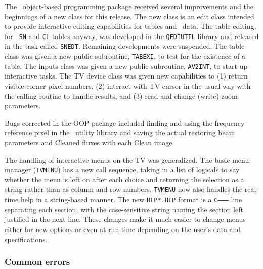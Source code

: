      The \AIPS\ object-based programming package received several
improvements and the beginnings of a new class for this release.  The
new class is an edit class intended to provide interactive editing
capabilities for tables and \uv\ data.  The table editing, for {\tt
SN} and {\tt CL} tables anyway, was developed in the {\tt QEDIUTIL}
library and released in the task called \hbox{{\tt SNEDT}}.  Remaining
developments were suspended.  The table class was given a new public
subroutine, {\tt TABEXI}, to test for the existence of a table.  The
inputs class was given a new public subroutine, {\tt AV2INT}, to start
up interactive tasks. The TV device class was given new capabilities
to (1) return visible-corner pixel numbers, (2) interact with TV
cursor in the usual way with the calling routine to handle results,
and (3) read and change (write) zoom parameters.

      Bugs corrected in the OOP package included finding and using the
frequency reference pixel in the \uv\ utility library and saving the
actual restoring beam parameters and Cleaned fluxes with each Clean
image.

     The handling of interactive menus on the TV was generalized.  The
basic menu manager ({\tt TVMENU}) has a new call sequence, taking in a
list of logicals to say whether the menu is left on after each choice
and returning the selection as a string rather than as column and row
numbers.  {\tt TVMENU} now also handles the real-time help in a
string-based manner.  The new {\tt HLP*.HLP} format is a {\tt C--------}
line separating each section, with the case-sensitive string naming
the section left justified in the next line.  These changes make it
much easier to change menus either for new options or even at run time
depending on the user's data and specifications.

\subsubsection{Common errors}

